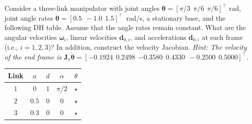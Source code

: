 \documentclass[12pt]{article}
\newenvironment{problem}[2][Problem]{\begin{trivlist}
\item[\hskip \labelsep {\bfseries #1}\hskip \labelsep {\bfseries #2.}]}{\end{trivlist}}
\begin{document}
\newpage
\begin{problem}{3}%
Consider a three-link manipulator with joint angles $\boldsymbol{\theta} = [\pi/3 \ \ \pi/6 \ \ \pi/6]^{\intercal}$ rad, joint angle rates $\dot{\boldsymbol{\theta}} = [0.5 \ \ -1.0\ \ 1.5]^{\intercal}$~rad/s, a stationary base, and the following DH table.  Assume that the angle rates remain constant. What are the angular velocities $\boldsymbol{\omega}_i$, linear velocities $\dot{\boldsymbol{d}}_{0,i}$, and accelerations $\ddot{\boldsymbol{d}}_{0,i}$ at each frame (i.e., $i=1,2,3$)? In addition, construct the velocity Jacobian. \textit{Hint: The velocity of the end frame is } $\boldsymbol{J}_{\textrm{v}} \dot{\boldsymbol{\theta}} = [ -0.1924\ \ 0.2498\ \ {-0.3580}\ \ 0.4330\ \ -0.2500\ \ 0.5000]^{\intercal}$.

\begin{table}[!h]
\centering
\begin{tabular}{c | c | c | c | c}
\hline 
 {Link} & $a$   & $d$  & $\alpha$ & $\theta$\\  \hline
 $1$    & $0$   & $1$  & $\pi/2$  & $\star$ \\ 
 $2$    & $0.5$ & $0$  & $0$      & $\star$ \\ 
 $3$    & $0.3$ & $0$  & $0$      & $\star$ \\  \hline
\end{tabular}\label{tab:part_1_ii}
\end{table}


\end{problem}
\end{document}

